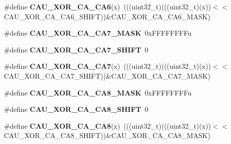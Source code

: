 \begin{DoxyCompactItemize}
\item 
\#define {\bfseries C\+A\+U\+\_\+\+X\+O\+R\+\_\+\+C\+A\+\_\+\+C\+A6}(x)~(((uint32\+\_\+t)(((uint32\+\_\+t)(x))$<$$<$C\+A\+U\+\_\+\+X\+O\+R\+\_\+\+C\+A\+\_\+\+C\+A6\+\_\+\+S\+H\+I\+FT))\&C\+A\+U\+\_\+\+X\+O\+R\+\_\+\+C\+A\+\_\+\+C\+A6\+\_\+\+M\+A\+SK)\hypertarget{group__CAU__Register__Masks_ga0caf44b77f17a23d0e941f9f5954a7fb}{}\label{group__CAU__Register__Masks_ga0caf44b77f17a23d0e941f9f5954a7fb}

\item 
\#define {\bfseries C\+A\+U\+\_\+\+X\+O\+R\+\_\+\+C\+A\+\_\+\+C\+A7\+\_\+\+M\+A\+SK}~0x\+F\+F\+F\+F\+F\+F\+F\+Fu\hypertarget{group__CAU__Register__Masks_ga06eab58058cee7fd45b4cd4275568892}{}\label{group__CAU__Register__Masks_ga06eab58058cee7fd45b4cd4275568892}

\item 
\#define {\bfseries C\+A\+U\+\_\+\+X\+O\+R\+\_\+\+C\+A\+\_\+\+C\+A7\+\_\+\+S\+H\+I\+FT}~0\hypertarget{group__CAU__Register__Masks_ga69445bae6fa41c545996396a9af56d61}{}\label{group__CAU__Register__Masks_ga69445bae6fa41c545996396a9af56d61}

\item 
\#define {\bfseries C\+A\+U\+\_\+\+X\+O\+R\+\_\+\+C\+A\+\_\+\+C\+A7}(x)~(((uint32\+\_\+t)(((uint32\+\_\+t)(x))$<$$<$C\+A\+U\+\_\+\+X\+O\+R\+\_\+\+C\+A\+\_\+\+C\+A7\+\_\+\+S\+H\+I\+FT))\&C\+A\+U\+\_\+\+X\+O\+R\+\_\+\+C\+A\+\_\+\+C\+A7\+\_\+\+M\+A\+SK)\hypertarget{group__CAU__Register__Masks_ga697949052f840f6e57c5d343f8753fbd}{}\label{group__CAU__Register__Masks_ga697949052f840f6e57c5d343f8753fbd}

\item 
\#define {\bfseries C\+A\+U\+\_\+\+X\+O\+R\+\_\+\+C\+A\+\_\+\+C\+A8\+\_\+\+M\+A\+SK}~0x\+F\+F\+F\+F\+F\+F\+F\+Fu\hypertarget{group__CAU__Register__Masks_ga5dae0bacc10008301389f42a02bdd3d4}{}\label{group__CAU__Register__Masks_ga5dae0bacc10008301389f42a02bdd3d4}

\item 
\#define {\bfseries C\+A\+U\+\_\+\+X\+O\+R\+\_\+\+C\+A\+\_\+\+C\+A8\+\_\+\+S\+H\+I\+FT}~0\hypertarget{group__CAU__Register__Masks_gab7debaaae0a6137460fd18cf952033ae}{}\label{group__CAU__Register__Masks_gab7debaaae0a6137460fd18cf952033ae}

\item 
\#define {\bfseries C\+A\+U\+\_\+\+X\+O\+R\+\_\+\+C\+A\+\_\+\+C\+A8}(x)~(((uint32\+\_\+t)(((uint32\+\_\+t)(x))$<$$<$C\+A\+U\+\_\+\+X\+O\+R\+\_\+\+C\+A\+\_\+\+C\+A8\+\_\+\+S\+H\+I\+FT))\&C\+A\+U\+\_\+\+X\+O\+R\+\_\+\+C\+A\+\_\+\+C\+A8\+\_\+\+M\+A\+SK)\hypertarget{group__CAU__Register__Masks_gab9536ffd1d268cd301992645fd13d7fa}{}\label{group__CAU__Register__Masks_gab9536ffd1d268cd301992645fd13d7fa}


\end{DoxyCompactItemize}
